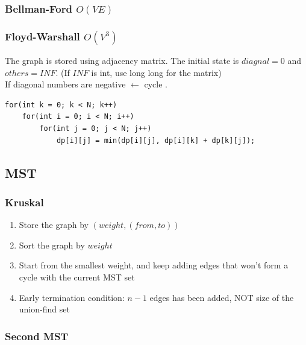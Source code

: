 \documentclass[10pt,oneside]{article}
\begin{document}
\begin{landscape}
\begin{multicols}{2}

\subsubsection{Bellman-Ford $O(VE)$}

\subsubsection{Floyd-Warshall $O(V^3)$}
{\normalsize 
The graph is stored using adjacency matrix. The initial state is $diagnal = 0$ and $others = INF$. (If $INF$ is int, use long long for the matrix)\\
If diagonal numbers are negative $\leftarrow$ cycle . \\
}

\begin{verbatim}
for(int k = 0; k < N; k++)
    for(int i = 0; i < N; i++)
        for(int j = 0; j < N; j++)
            dp[i][j] = min(dp[i][j], dp[i][k] + dp[k][j]);
\end{verbatim}

\subsection{MST}

\subsubsection{Kruskal}

{\normalsize 
\begin{enumerate}
	\item Store the graph by $(weight, (from , to))$
	\item Sort the graph by $weight$ 
	\item Start from the smallest weight, and keep adding edges that won't form a cycle with the current MST set
	\item Early termination condition: $n - 1$ edges has been added, NOT size of the union-find set
\end{enumerate}
}

\subsubsection{Second MST}


\end{multicols}
\end{landscape}
\end{document}
